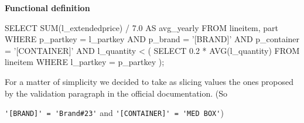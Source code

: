 \textbf{Functional definition}
\begin{sql}
SELECT
    SUM(l_extendedprice) / 7.0 AS avg_yearly
FROM 
    lineitem, 
    part
WHERE 
    p_partkey = l_partkey
    AND p_brand = '[BRAND]'
    AND p_container = '[CONTAINER]'
    AND l_quantity < ( 
                        SELECT 
                            0.2 * AVG(l_quantity)
                        FROM 
                            lineitem
                        WHERE 
                            l_partkey = p_partkey
                      );

\end{sql}

For a matter of simplicity we decided to take as slicing values the ones proposed by the validation paragraph in the official documentation. (So 

\verb|'[BRAND]' = 'Brand#23'| and \verb|'[CONTAINER]' = 'MED BOX'|)
